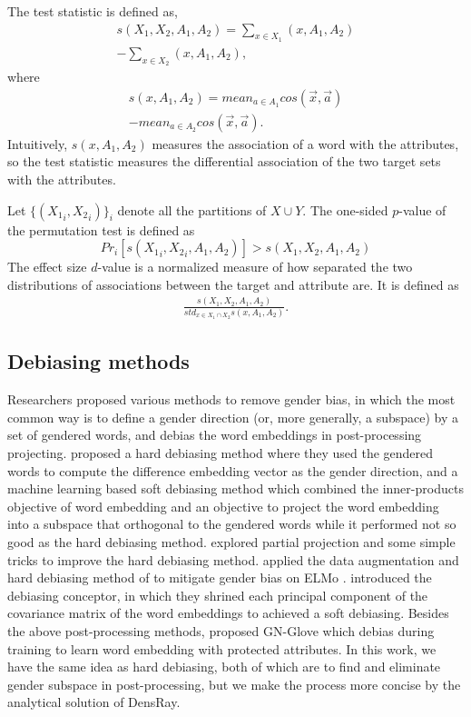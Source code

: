 The test statistic is defined as,
\begin{eqnarray}
s(X_1,X_2,A_1,A_2)=\sum_{x\in X_1}(x,A_1,A_2)\nonumber\\
-\sum_{x\in X_2}(x,A_1,A_2),\nonumber
\end{eqnarray}
where
\begin{eqnarray}
s(x,A_1,A_2)=mean_{a\in A_1}cos(\vec{x},\vec{a})\nonumber\\
-mean_{a\in A_2}cos(\vec{x},\vec{a}).\nonumber
\end{eqnarray}
Intuitively, $s(x,A_1,A_2)$ measures the association of a word with the attributes, so the test statistic measures the differential association of the two target sets with the attributes. 

Let $\{({X_1}_i,{X_2}_i)\}_{i}$ denote all the partitions of $X\cup Y$. The one-sided $p$-value of the permutation test is defined as $$Pr_i[s({X_1}_i,{X_2}_i,A_1,A_2)]>s(X_1,X_2,A_1,A_2)$$
The effect size $d$-value is a normalized measure of how separated the two distributions of associations between the target and attribute are. It is defined as
\begin{eqnarray}
\frac{s(X_1,X_2,A_1,A_2)}{std_{x\in X_1 \cap X_2}s(x,A_1,A_2)}.\nonumber
\end{eqnarray}

\subsection{Debiasing methods}
Researchers proposed various methods to remove gender bias, in which the most common way is to define a gender direction (or, more generally, a subspace) by a set of gendered words, and debias the word embeddings in post-processing projecting. \citet{bolukbasi2016man} proposed a hard debiasing method where they used the gendered words to compute the difference embedding vector as the gender direction, and a machine learning based soft debiasing method which combined the inner-products objective of word embedding and an objective to project the word embedding into a subspace that orthogonal to the gendered words while it performed not so good as the hard debiasing method. \citet{dev2019attenuating} explored partial projection and some simple tricks to improve the hard debiasing method. \citet{zhao2019gender} applied the data augmentation and hard debiasing method of \citet{bolukbasi2016man} to mitigate gender bias on ELMo \citep{Peters:2018}. \citet{karve2019conceptor} introduced the debiasing conceptor, in which they shrined each principal component of the covariance matrix of the word embeddings to achieved a soft debiasing. Besides the above post-processing methods, \citep{zhao2018learning} proposed GN-Glove which debias during training to learn word embedding with protected attributes. In this work, we have the same idea as hard debiasing, both of which are to find and eliminate gender subspace in post-processing, but we make the process more concise by the analytical solution of DensRay.

